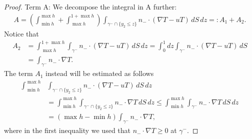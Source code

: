 \documentclass{article}
\theoremstyle{definition}
\theoremstyle{definition}
\newcommand{\gminus}{\gamma^-}
\begin{document}
\begin{proof}
Term A: We decompose the integral in A further:
\begin{align*}
    A=\left(\int_{\min h}^{\max h}+\int_{\max h}^{1+\max h}\right)\int_{\gminus\cap\{y_2\leq z\}}n_-\cdot (\nabla T-uT)\, dS\, dz=:A_1+A_2.
\end{align*}
Notice that
\begin{align*}
    A_2&=\int_{\max h}^{1+\max h}\int_{\gminus}n_-\cdot (\nabla T-uT)\, dS\, dz=\int_{0}^{1} dz\int_{\gminus}n_-\cdot (\nabla T-uT)\, dS 
    \\
    &=\int_{\gminus}n_-\cdot \nabla T.
\end{align*}
The term $A_1$ instead will be estimated as follows
\begin{align*}
    \int_{\min h}^{\max h}&\int_{\gminus\cap\{y_2\leq z\}}n_-\cdot (\nabla T-uT)\, dS\, dz
    \\
    &=\int_{\min h}^{\max h}\int_{\gminus\cap\{y_2\leq z\}}n_-\cdot \nabla T\, dS\, dz
    \leq\int_{\min h}^{\max h}\int_{\gminus}n_-\cdot \nabla T\, dS\, dz
    \\
    &= (\max h - \min h)\int_{\gminus}n_-\cdot \nabla T,
\end{align*}
where in the first inequality we used that $n_-\cdot \nabla T\geq 0$ at $\gminus$.


\end{proof}
\end{document}
